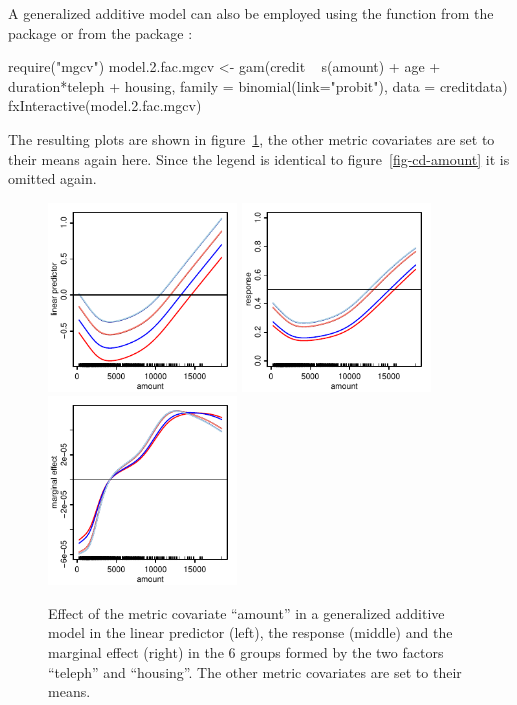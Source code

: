 \documentclass[nojss]{jss}
\newcommand{\quotes}[1]{``#1''}
\begin{document}
A generalized additive model can also be employed using the function  from the package  \citep{Wood2014} or from the package  \citep{Hast2013}:  
\begin{Schunk}
\begin{Sinput}
 require("mgcv") 
 model.2.fac.mgcv <- gam(credit ~ s(amount) + age + duration*teleph + housing,  
     family = binomial(link="probit"), data = creditdata)
 fxInteractive(model.2.fac.mgcv)
\end{Sinput}
\end{Schunk}
%
The resulting plots are shown in figure~\ref{fig-cd-amount-mgcv}, the other metric covariates are set to their means again here.   Since the legend is identical to figure~\ref{fig-cd-amount} it is omitted again. 

\begin{figure}[H]
\centering
\includegraphics[width=5cm]{cd-amount-mgcv-link} \includegraphics[width=5cm]{cd-amount-mgcv-resp} \includegraphics[width=5cm]{cd-amount-mgcv-marg}
\caption{Effect of the metric covariate \quotes{amount} in a generalized additive model in the linear predictor (left), the response (middle) and the marginal effect (right) in the 6 groups formed by the two factors \quotes{teleph} and \quotes{housing}. The other metric covariates are set to their means.} \label{fig-cd-amount-mgcv}
\end{figure}
\end{document}
